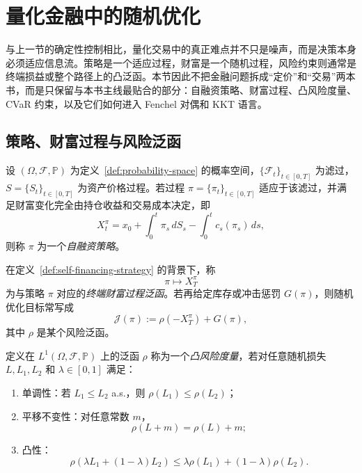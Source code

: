 \section{量化金融中的随机优化}

\label{sec:11-2}

与上一节的确定性控制相比，量化交易中的真正难点并不只是噪声，而是决策本身必须适应信息流。策略是一个适应过程，财富是一个随机过程，风险约束则通常是终端损益或整个路径上的凸泛函。本节因此不把金融问题拆成“定价”和“交易”两本书，而是只保留与本书主线最贴合的部分：自融资策略、财富过程、凸风险度量、CVaR 约束，以及它们如何进入 Fenchel 对偶和 KKT 语言。

\subsection{策略、财富过程与风险泛函}

\begin{definition}[自融资策略]\label{def:self-financing-strategy}
设 $(\Omega,\mathscr F,\mathbb P)$ 为定义~\ref{def:probability-space} 的概率空间，$\{\mathscr F_t\}_{t\in[0,T]}$ 为滤过，$S=\{S_t\}_{t\in[0,T]}$ 为资产价格过程。若过程 $\pi=\{\pi_t\}_{t\in[0,T]}$ 适应于该滤过，并满足财富变化完全由持仓收益和交易成本决定，即
\[
X_t^\pi
=
x_0+\int_0^t \pi_s\,dS_s-\int_0^t c_s(\pi_s)\,ds,
\]
则称 $\pi$ 为一个\emph{自融资策略}。
\end{definition}

\begin{definition}[财富过程泛函]\label{def:wealth-process-functional}
在定义~\ref{def:self-financing-strategy} 的背景下，称
\[
\pi \longmapsto X_T^\pi
\]
为与策略 $\pi$ 对应的\emph{终端财富过程泛函}。若再给定库存或冲击惩罚 $G(\pi)$，则随机优化目标常写成
\[
\mathcal J(\pi):=\rho(-X_T^\pi)+G(\pi),
\]
其中 $\rho$ 是某个风险泛函。
\end{definition}

\begin{definition}[凸风险度量]\label{def:convex-risk-measure}
定义在 $L^1(\Omega,\mathscr F,\mathbb P)$ 上的泛函 $\rho$ 称为一个\emph{凸风险度量}，若对任意随机损失 $L,L_1,L_2$ 和 $\lambda\in[0,1]$ 满足：
\begin{enumerate}
  \item 单调性：若 $L_1\le L_2$ a.s.，则 $\rho(L_1)\le \rho(L_2)$；
  \item 平移不变性：对任意常数 $m$，
  \[
  \rho(L+m)=\rho(L)+m;
  \]
  \item 凸性：
  \[
  \rho(\lambda L_1+(1-\lambda)L_2)
  \le
  \lambda \rho(L_1)+(1-\lambda)\rho(L_2).
  \]
\end{enumerate}
\end{definition}

